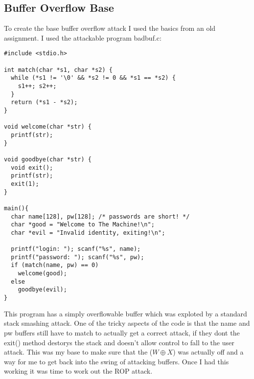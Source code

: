 \documentclass[11pt]{amsart}
\begin{document}
\subsection*{Buffer Overflow Base}
To create the base buffer overflow attack I used the basics from an old assignment.  I used the attackable program badbuf.c:
\begin{verbatim}
#include <stdio.h>

int match(char *s1, char *s2) {
  while (*s1 != '\0' && *s2 != 0 && *s1 == *s2) {
    s1++; s2++;
  }
  return (*s1 - *s2);
}

void welcome(char *str) {
  printf(str);
}

void goodbye(char *str) { 
  void exit(); 
  printf(str); 
  exit(1); 
}

main(){
  char name[128], pw[128]; /* passwords are short! */
  char *good = "Welcome to The Machine!\n";
  char *evil = "Invalid identity, exiting!\n";

  printf("login: "); scanf("%s", name);
  printf("password: "); scanf("%s", pw);
  if (match(name, pw) == 0)
    welcome(good);
  else
    goodbye(evil);
}
\end{verbatim}

This program has a simply overflowable buffer which was exploted by a standard stack smashing attack. One of the tricky aspects of the code is that the name and pw buffers still have to match to actually get a correct attack, if they dont the exit() method destorys the stack and doesn't allow control to fall to the user attack. This was my base to make sure that the ($W \oplus X$) was actually off and a way for me to get back into the swing of attacking buffers.  Once I had this working it was time to work out the ROP attack.
\end{document}
